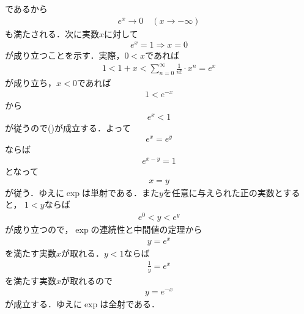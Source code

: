 \begin{sketch}
		であるから
		\begin{align}
			e^x \longrightarrow 0 \quad (x \longrightarrow -\infty)
		\end{align}
		も満たされる．次に実数$x$に対して
		\begin{align}
			e^x = 1 \Longrightarrow x=0
			\label{fom:thm_real_valued_exponential_function}
		\end{align}
		が成り立つことを示す．実際，$0 < x$であれば
		\begin{align}
			1 < 1 + x < \sum_{n=0}^{\infty} \frac{1}{n!} \cdot x^n = e^{x}
		\end{align}
		が成り立ち，$x < 0$であれば
		\begin{align}
			1 < e^{-x}
		\end{align}
		から
		\begin{align}
			e^{x} < 1
		\end{align}
		が従うので()が成立する．よって
		\begin{align}
			e^x = e^y
		\end{align}
		ならば
		\begin{align}
			e^{x - y} = 1
		\end{align}
		となって
		\begin{align}
			x = y
		\end{align}
		が従う．ゆえに$\exp$は単射である．また$y$を任意に与えられた正の実数とすると，
		$1 < y$ならば
		\begin{align}
			e^{0} < y < e^{y}
		\end{align}
		が成り立つので，$\exp$の連続性と中間値の定理から
		\begin{align}
			y = e^{x}
		\end{align}
		を満たす実数$x$が取れる．$y < 1$ならば
		\begin{align}
			\frac{1}{y} = e^{x}
		\end{align}
		を満たす実数$x$が取れるので
		\begin{align}
			y = e^{-x}
		\end{align}
		が成立する．ゆえに$\exp$は全射である．
		\QED
	\end{sketch}